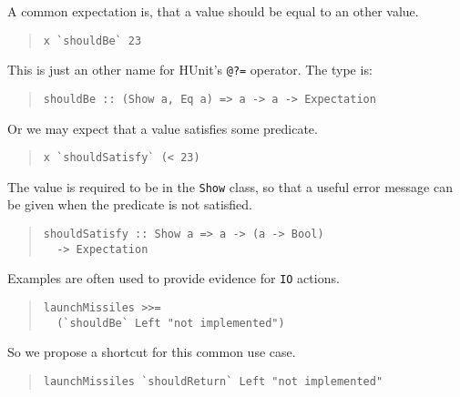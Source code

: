 \documentclass[preprint]{sigplanconf}
\begin{document}
\noindent A common expectation is, that a value should be equal to an other
value.

\begin{quote}\small\begin{verbatim}
x `shouldBe` 23
\end{verbatim}\end{quote}

\noindent This is just an other name for HUnit's \texttt{@?=}
operator.  The type is:

\begin{quote}\small\begin{verbatim}
shouldBe :: (Show a, Eq a) => a -> a -> Expectation
\end{verbatim}\end{quote}

\noindent Or we may expect that a value satisfies some predicate.

\begin{quote}\small\begin{verbatim}
x `shouldSatisfy` (< 23)
\end{verbatim}\end{quote}

\noindent The value is required to be in the \texttt{Show} class, so that a
useful error message can be given when the predicate is not satisfied.

\begin{quote}\small\begin{verbatim}
shouldSatisfy :: Show a => a -> (a -> Bool)
  -> Expectation
\end{verbatim}\end{quote}

\noindent Examples are often used to provide evidence for {\tt IO}
actions.

\begin{quote}\small\begin{verbatim}
launchMissiles >>=
  (`shouldBe` Left "not implemented")
\end{verbatim}\end{quote}

\noindent So we propose a shortcut for this common use case.

\begin{quote}\small\begin{verbatim}
launchMissiles `shouldReturn` Left "not implemented"
\end{verbatim}\end{quote}
\end{document}
